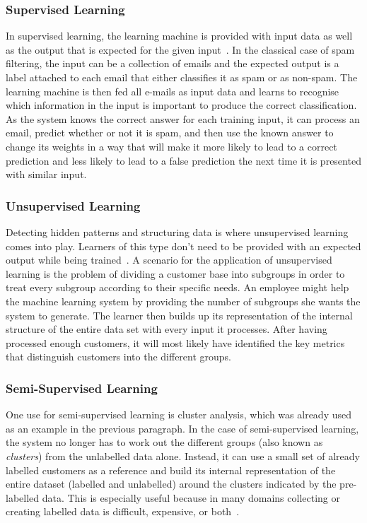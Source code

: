 \documentclass[
			   fontsize=11pt,
               paper=a4,
               bibliography=totoc,
               idxtotoc,
               headsepline,
               footsepline,
               footinclude=false,
               BCOR=12mm,
               DIV=13,
               openany,   %
               ]
               {scrbook}
\begin{document}
\subsubsection{Supervised Learning}
In supervised learning, the learning machine is provided with input data as well as the output that is expected for the given input~\cite{introSupervised}. In the classical case of spam filtering, the input can be a collection of emails and the expected output is a label attached to each email that either classifies it as spam or as non-spam. The learning machine is then fed all e-mails as input data and learns to recognise which information in the input is important to produce the correct classification. As the system knows the correct answer for each training input, it can process an email, predict whether or not it is spam, and then use the known answer to change its weights in a way that will make it more likely to lead to a correct prediction and less likely to lead to a false prediction the next time it is presented with similar input.

\subsubsection{Unsupervised Learning}
Detecting hidden patterns and structuring data is where unsupervised learning comes into play. Learners of this type don't need to be provided with an expected output while being trained~\cite{introUnsupervised}. A scenario for the application of unsupervised learning is the problem of dividing a customer base into subgroups in order to treat every subgroup according to their specific needs. An employee might help the machine learning system by providing the number of subgroups she wants the system to generate. The learner then builds up its representation of the internal structure of the entire data set with every input it processes. After having processed enough customers, it will most likely have identified the key metrics that distinguish customers into the different groups. 

\subsubsection{Semi-Supervised Learning}
One use for semi-supervised learning is cluster analysis, which was already used as an example in the previous paragraph. In the case of semi-supervised learning, the system no longer has to work out the different groups (also known as \textit{clusters}) from the unlabelled data alone. Instead, it can use a small set of already labelled customers as a reference and build its internal representation of the entire dataset (labelled and unlabelled) around the clusters indicated by the pre-labelled data. This is especially useful because in many domains collecting or creating labelled data is difficult, expensive, or both~\cite{introSemiSup}.
\end{document}
